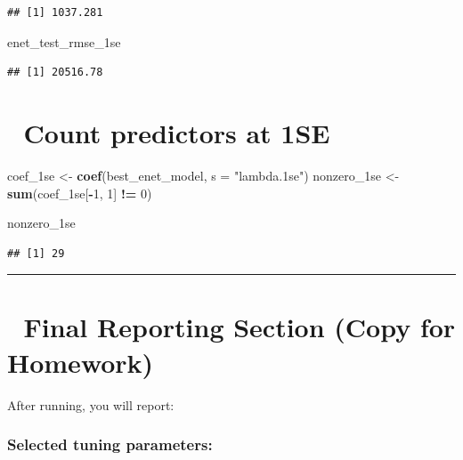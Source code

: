 \documentclass[
]{article}
\newenvironment{Shaded}{\begin{snugshade}}{\end{snugshade}}
\newcommand{\AttributeTok}[1]{\textcolor[rgb]{0.13,0.29,0.53}{#1}}
\newcommand{\DecValTok}[1]{\textcolor[rgb]{0.00,0.00,0.81}{#1}}
\newcommand{\FunctionTok}[1]{\textcolor[rgb]{0.13,0.29,0.53}{\textbf{#1}}}
\newcommand{\NormalTok}[1]{#1}
\newcommand{\OtherTok}[1]{\textcolor[rgb]{0.56,0.35,0.01}{#1}}
\newcommand{\SpecialCharTok}[1]{\textcolor[rgb]{0.81,0.36,0.00}{\textbf{#1}}}
\newcommand{\StringTok}[1]{\textcolor[rgb]{0.31,0.60,0.02}{#1}}
\begin{document}
\begin{verbatim}
## [1] 1037.281
\end{verbatim}

\begin{Shaded}
\begin{Highlighting}[]
\NormalTok{enet\_test\_rmse\_1se}
\end{Highlighting}
\end{Shaded}

\begin{verbatim}
## [1] 20516.78
\end{verbatim}

\section{🔎 Count predictors at 1SE}\label{count-predictors-at-1se}

\begin{Shaded}
\begin{Highlighting}[]
\NormalTok{coef\_1se }\OtherTok{\textless{}{-}} \FunctionTok{coef}\NormalTok{(best\_enet\_model, }\AttributeTok{s =} \StringTok{"lambda.1se"}\NormalTok{)}
\NormalTok{nonzero\_1se }\OtherTok{\textless{}{-}} \FunctionTok{sum}\NormalTok{(coef\_1se[}\SpecialCharTok{{-}}\DecValTok{1}\NormalTok{, }\DecValTok{1}\NormalTok{] }\SpecialCharTok{!=} \DecValTok{0}\NormalTok{)}

\NormalTok{nonzero\_1se}
\end{Highlighting}
\end{Shaded}

\begin{verbatim}
## [1] 29
\end{verbatim}

\begin{center}\rule{0.5\linewidth}{0.5pt}\end{center}

\section{🔷 Final Reporting Section (Copy for
Homework)}\label{final-reporting-section-copy-for-homework}

After running, you will report:

\subsubsection{Selected tuning
parameters:}\label{selected-tuning-parameters}
\end{document}
